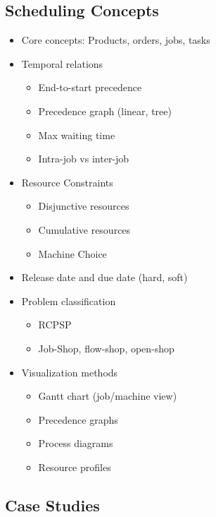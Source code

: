 \documentclass[a4paper]{article}
\begin{document}
\subsection{Scheduling Concepts}
\begin{itemize}
\item Core concepts: Products, orders, jobs, tasks
\item Temporal relations
\begin{itemize}
\item End-to-start precedence
\item Precedence graph (linear, tree)
\item Max waiting time
\item Intra-job vs inter-job
\end{itemize}
\item Resource Constraints
\begin{itemize}
\item Disjunctive resources
\item Cumulative resources
\item Machine Choice
\end{itemize}
\item Release date and due date (hard, soft)
\item Problem classification
\begin{itemize}
\item RCPSP
\item Job-Shop, flow-shop, open-shop
\end{itemize}
\item Visualization methods
\begin{itemize}
\item Gantt chart (job/machine view)
\item Precedence graphs
\item Process diagrams
\item Resource profiles
\end{itemize}
\end{itemize}


\subsection{Case Studies}
\end{document}
